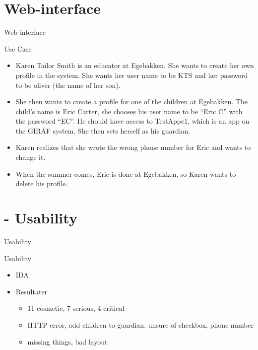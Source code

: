 \section{Web-interface}
\begin{frame}{Web-interface}
\pause
		\begin{block}{Use Case}
				\begin{itemize}
					\item Karen Tailor Smith is an educator at Egebakken. She wants to create her own profile in the system. She wants her user name to be KTS and her password to be oliver (the name of her son).
					\item She then wants to create a profile for one of the children at Egebakken. The child's name is Eric Carter, she chooses his user name to be ``Eric C'' with the password ``EC''. He should have access to TestAppe1, which is an app on the GIRAF system. She then sets herself as his guardian.
					\item Karen realizes that she wrote the wrong phone number for Eric and wants to change it.
					\item When the summer comes, Eric is done at Egebakken, so Karen wants to delete his profile.
				\end{itemize}
		\end{block}
\end{frame}

\section{ - Usability}
\begin{frame}{Usability}
\pause
		\begin{block}{Usability}
			\begin{itemize}
				\pause
				\item IDA
				\pause
				\item Resultater
				\begin{itemize}
				\pause
					\item 11 cosmetic, 7 serious, 4 critical
					\pause
					\item HTTP error, add children to guardian, unsure of checkbox, phone number
					\pause
					\item missing things, bad layout
				\end{itemize}
			\end{itemize}
		\end{block}
\end{frame}